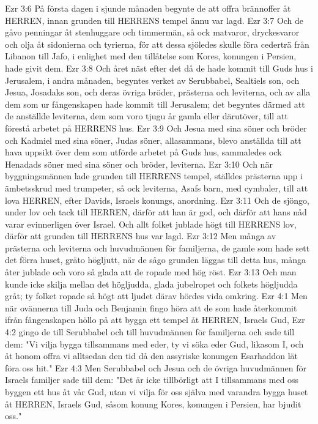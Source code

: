 Ezr 3:6  På första dagen i sjunde månaden begynte de att offra brännoffer åt HERREN, innan grunden till HERRENS tempel ännu var lagd.
Ezr 3:7  Och de gåvo penningar åt stenhuggare och timmermän, så ock matvaror, dryckesvaror och olja åt sidonierna och tyrierna, för att dessa sjöledes skulle föra cederträ från Libanon till Jafo, i enlighet med den tillåtelse som Kores, konungen i Persien, hade givit dem.
Ezr 3:8  Och året näst efter det då de hade kommit till Guds hus i Jerusalem, i andra månaden, begyntes verket av Serubbabel, Sealtiels son, och Jesua, Josadaks son, och deras övriga bröder, prästerna och leviterna, och av alla dem som ur fångenskapen hade kommit till Jerusalem; det begyntes därmed att de anställde leviterna, dem som voro tjugu år gamla eller därutöver, till att förestå arbetet på HERRENS hus.
Ezr 3:9  Och Jesua med sina söner och bröder och Kadmiel med sina söner, Judas söner, allasammans, blevo anställda till att hava uppsikt över dem som utförde arbetet på Guds hus, sammaledes ock Henadads söner med sina söner och bröder, leviterna.
Ezr 3:10  Och när byggningsmännen lade grunden till HERRENS tempel, ställdes prästerna upp i ämbetsskrud med trumpeter, så ock leviterna, Asafs barn, med cymbaler, till att lova HERREN, efter Davids, Israels konungs, anordning.
Ezr 3:11  Och de sjöngo, under lov och tack till HERREN, därför att han är god, och därför att hans nåd varar evinnerligen över Israel. Och allt folket jublade högt till HERRENS lov, därför att grunden till HERRENS hus var lagd.
Ezr 3:12  Men många av prästerna och leviterna och huvudmännen för familjerna, de gamle som hade sett det förra huset, gräto högljutt, när de sågo grunden läggas till detta hus, många åter jublade och voro så glada att de ropade med hög röst.
Ezr 3:13  Och man kunde icke skilja mellan det högljudda, glada jubelropet och folkets högljudda gråt; ty folket ropade så högt att ljudet därav hördes vida omkring.
Ezr 4:1  Men när ovännerna till Juda och Benjamin fingo höra att de som hade återkommit ifrån fångenskapen höllo på att bygga ett tempel åt HERREN, Israels Gud,
Ezr 4:2  gingo de till Serubbabel och till huvudmännen för familjerna och sade till dem: "Vi vilja bygga tillsammans med eder, ty vi söka eder Gud, likasom I, och åt honom offra vi alltsedan den tid då den assyriske konungen Esarhaddon lät föra oss hit."
Ezr 4:3  Men Serubbabel och Jesua och de övriga huvudmännen för Israels familjer sade till dem: "Det är icke tillbörligt att I tillsammans med oss byggen ett hus åt vår Gud, utan vi vilja för oss själva med varandra bygga huset åt HERREN, Israels Gud, såsom konung Kores, konungen i Persien, har bjudit oss."

